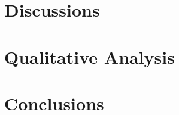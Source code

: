 \documentclass[letterpaper]{article}
\begin{document}
\section{Discussions}

\section{Qualitative Analysis}


\section{Conclusions}
{}



\end{document}
